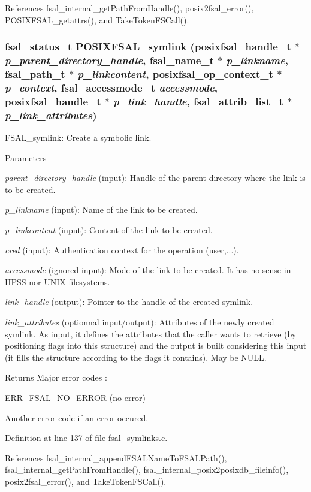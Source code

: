 References fsal\_\-internal\_\-getPathFromHandle(), posix2fsal\_\-error(), POSIXFSAL\_\-getattrs(), and TakeTokenFSCall().
\subsubsection[{POSIXFSAL\_\-symlink}]{\setlength{\rightskip}{0pt plus 5cm}fsal\_\-status\_\-t POSIXFSAL\_\-symlink (posixfsal\_\-handle\_\-t $\ast$ {\em p\_\-parent\_\-directory\_\-handle}, \/  fsal\_\-name\_\-t $\ast$ {\em p\_\-linkname}, \/  fsal\_\-path\_\-t $\ast$ {\em p\_\-linkcontent}, \/  posixfsal\_\-op\_\-context\_\-t $\ast$ {\em p\_\-context}, \/  fsal\_\-accessmode\_\-t {\em accessmode}, \/  posixfsal\_\-handle\_\-t $\ast$ {\em p\_\-link\_\-handle}, \/  fsal\_\-attrib\_\-list\_\-t $\ast$ {\em p\_\-link\_\-attributes})}\label{fsal__symlinks_8c_a86dc18d6bddd6e7a05c401824b036814}
FSAL\_\-symlink: Create a symbolic link.


\begin{DoxyParams}{Parameters}
\item[{\em parent\_\-directory\_\-handle}](input): Handle of the parent directory where the link is to be created. \item[{\em p\_\-linkname}](input): Name of the link to be created. \item[{\em p\_\-linkcontent}](input): Content of the link to be created. \item[{\em cred}](input): Authentication context for the operation (user,...). \item[{\em accessmode}](ignored input): Mode of the link to be created. It has no sense in HPSS nor UNIX filesystems. \item[{\em link\_\-handle}](output): Pointer to the handle of the created symlink. \item[{\em link\_\-attributes}](optionnal input/output): Attributes of the newly created symlink. As input, it defines the attributes that the caller wants to retrieve (by positioning flags into this structure) and the output is built considering this input (it fills the structure according to the flags it contains). May be NULL.\end{DoxyParams}
\begin{DoxyReturn}{Returns}
Major error codes :
\begin{DoxyItemize}
\item ERR\_\-FSAL\_\-NO\_\-ERROR (no error)
\item Another error code if an error occured. 
\end{DoxyItemize}
\end{DoxyReturn}


Definition at line 137 of file fsal\_\-symlinks.c.

References fsal\_\-internal\_\-appendFSALNameToFSALPath(), fsal\_\-internal\_\-getPathFromHandle(), fsal\_\-internal\_\-posix2posixdb\_\-fileinfo(), posix2fsal\_\-error(), and TakeTokenFSCall().